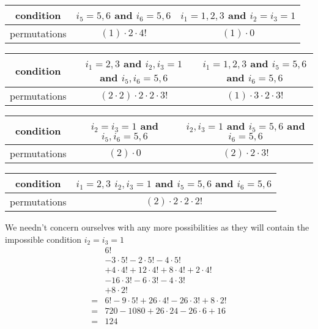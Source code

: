 \documentclass{article}
\begin{document}
\begin{enumerate}
\begin{tabular}{c|c|c}
condition&
$i_5=5,6$ and $i_6=5,6$&
$i_1=1,2,3$ and $i_2=i_3=1$
\\
\hline
permutations&
$(1)\cdot2\cdot4!$&
$(1)\cdot0$
\end{tabular}

\begin{tabular}{c|c|c}
condition&
$i_1=2,3$ and $i_2,i_3=1$ and $i_5,i_6=5,6$&
$i_1=1,2,3$ and $i_5=5,6$ and $i_6=5,6$
\\
\hline
permutations&
$(2\cdot2)\cdot2\cdot2\cdot3!$&
$(1)\cdot3\cdot2\cdot3!$
\end{tabular}

\begin{tabular}{c|c|c}
condition&
$i_2=i_3=1$ and $i_5,i_6=5,6$&
$i_2,i_3=1$ and $i_5=5,6$ and $i_6=5,6$
\\
\hline
permutations&
$(2)\cdot0$&
$(2)\cdot2\cdot3!$
\end{tabular}

\begin{tabular}{c|c}
condition&
$i_1=2,3$ $i_2,i_3=1$ and $i_5=5,6$ and $i_6=5,6$
\\
\hline
permutations&
$(2)\cdot2\cdot2\cdot2!$
\end{tabular}

We needn't concern ourselves with any more possibilities as they will contain the impossible condition $i_2=i_3=1$
\begin{align*}
  &6!\\
  &-3\cdot5!-2\cdot5!-4\cdot5!\\
  &+4\cdot4!+12\cdot4!+8\cdot4!+2\cdot4!\\
  &-16\cdot3!-6\cdot3!-4\cdot3!\\
  &+8\cdot2!\\
  =&6!-9\cdot5!+26\cdot4!-26\cdot3!+8\cdot2!\\
  =&720-1080+26\cdot24-26\cdot6+16\\
  =&124
\end{align*}
\end{enumerate}
\end{document}

